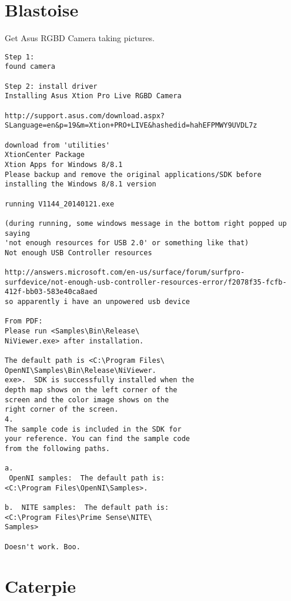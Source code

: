 \section{Blastoise}
\label{exp:Blastoise}
Get Asus RGBD Camera taking pictures.
\begin{lstlisting}
Step 1:
found camera

Step 2: install driver
Installing Asus Xtion Pro Live RGBD Camera

http://support.asus.com/download.aspx?SLanguage=en&p=19&m=Xtion+PRO+LIVE&hashedid=hahEFPMWY9UVDL7z

download from 'utilities'
XtionCenter Package
Xtion Apps for Windows 8/8.1
Please backup and remove the original applications/SDK before installing the Windows 8/8.1 version

running V1144_20140121.exe

(during running, some windows message in the bottom right popped up saying
'not enough resources for USB 2.0' or something like that)
Not enough USB Controller resources

http://answers.microsoft.com/en-us/surface/forum/surfpro-surfdevice/not-enough-usb-controller-resources-error/f2078f35-fcfb-412f-bb03-583e40ca8aed
so apparently i have an unpowered usb device

From PDF:
Please run <Samples\Bin\Release\
NiViewer.exe> after installation.
 
The default path is <C:\Program Files\
OpenNI\Samples\Bin\Release\NiViewer.
exe>.  SDK is successfully installed when the 
depth map shows on the left corner of the 
screen and the color image shows on the 
right corner of the screen.
4. 
The sample code is included in the SDK for 
your reference. You can find the sample code 
from the following paths.
 
a. 
 OpenNI samples:  The default path is: 
<C:\Program Files\OpenNI\Samples>.
 
b.  NITE samples:  The default path is: 
<C:\Program Files\Prime Sense\NITE\
Samples>

Doesn't work. Boo.

\end{lstlisting}
\section{Caterpie}
\label{exp:Caterpie}

